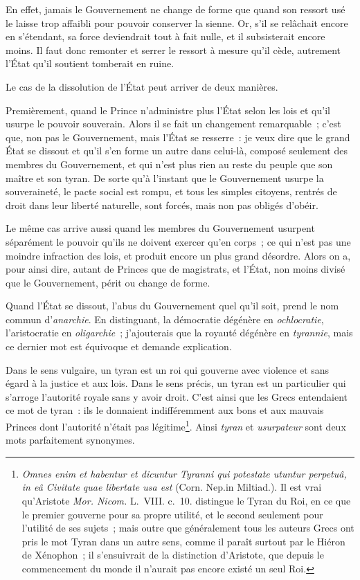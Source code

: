 \documentclass[french,twoside]{book} %
\begin{document}
En effet, jamais le Gouvernement ne change de forme que quand son ressort usé le laisse trop affaibli pour pouvoir conserver la sienne. Or, s’il se relâchait encore en s’étendant, sa force deviendrait tout à fait nulle, et il subsisterait encore moins. Il faut donc remonter et serrer le ressort à mesure qu’il cède, autrement l’État qu’il soutient tomberait en ruine.\par
Le cas de la dissolution de l’État peut arriver de deux manières.\par
Premièrement, quand le Prince n’administre plus l’État selon les lois et qu’il usurpe le pouvoir souverain. Alors il se fait un changement remarquable ; c’est que, non pas le Gouvernement, mais l’État se resserre : je veux dire que le grand État se dissout et qu’il s’en forme un autre dans celui-là, composé seulement des membres du Gouvernement, et qui n’est plus rien au reste du peuple que son maître et son tyran. De sorte qu’à l’instant que le Gouvernement usurpe la souveraineté, le pacte social est rompu, et tous les simples citoyens, rentrés de droit dans leur liberté naturelle, sont forcés, mais non pas obligés d’obéir.\par
Le même cas arrive aussi quand les membres du Gouvernement usurpent séparément le pouvoir qu’ils ne doivent exercer qu’en corps ; ce qui n’est pas une moindre infraction des lois, et produit encore un plus grand désordre. Alors on a, pour ainsi dire, autant de Princes que de magistrats, et l’État, non moins divisé que le Gouvernement, périt ou change de forme.\par
Quand l’État se dissout, l’abus du Gouvernement quel qu’il soit, prend le nom commun d’{\itshape anarchie}. En distinguant, la démocratie dégénère en {\itshape ochlocratie}, l’aristocratie en {\itshape oligarchie} ; j’ajouterais que la royauté dégénère en {\itshape tyrannie}, mais ce dernier mot est équivoque et demande explication.\par
Dans le sens vulgaire, un tyran est un roi qui gouverne avec violence et sans égard à la justice et aux lois. Dans le sens précis, un tyran est un particulier qui s’arroge l’autorité royale sans y avoir droit. C’est ainsi que les Grecs entendaient ce mot de tyran : ils le donnaient indifféremment aux bons et aux mauvais Princes dont l’autorité n’était pas légitime\footnote{{\itshape Omnes enim et habentur et dicuntur Tyranni qui potestate utuntur perpetuâ, in eâ Civitate quae libertate usa est} (Corn. Nep.in Miltiad.). Il est vrai qu’Aristote {\itshape Mor. Nicom.} L. VIII. c. 10. distingue le Tyran du Roi, en ce que le premier gouverne pour sa propre utilité, et le second seulement pour l’utilité de ses sujets ; mais outre que généralement tous les auteurs Grecs ont pris le mot Tyran dans un autre sens, comme il paraît surtout par le Hiéron de Xénophon ; il s’ensuivrait de la distinction d’Aristote, que depuis le commencement du monde il n’aurait pas encore existé un seul Roi.}. Ainsi {\itshape tyran} et {\itshape usurpateur} sont deux mots parfaitement synonymes.\par
\end{document}

